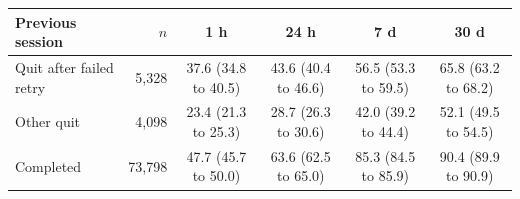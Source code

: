 \begin{tabular}{lrcccc}
\toprule
Previous session & $n$ & 1 h & 24 h & 7 d & 30 d \\
\midrule
Quit after failed retry & 5{,}328 & 37.6 (34.8 to 40.5) & 43.6 (40.4 to 46.6) & 56.5 (53.3 to 59.5) & 65.8 (63.2 to 68.2) \\
Other quit & 4{,}098 & 23.4 (21.3 to 25.3) & 28.7 (26.3 to 30.6) & 42.0 (39.2 to 44.4) & 52.1 (49.5 to 54.5) \\
Completed & 73{,}798 & 47.7 (45.7 to 50.0) & 63.6 (62.5 to 65.0) & 85.3 (84.5 to 85.9) & 90.4 (89.9 to 90.9) \\
\bottomrule
\end{tabular}
